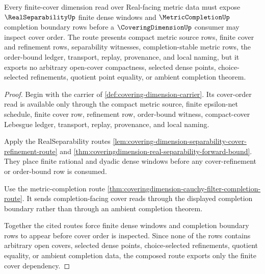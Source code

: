 \begin{theorem}
\label{thm:coveringdimension-real-separability-metric-completion-cover-route}
Every finite-cover dimension read over Real-facing metric data must expose $\RealSeparabilityUp$ finite dense windows and $\MetricCompletionUp$ completion boundary rows before a $\CoveringDimensionUp$ consumer may inspect cover order. The route presents compact metric source rows, finite cover and refinement rows, separability witnesses, completion-stable metric rows, the order-bound ledger, transport, replay, provenance, and local naming, but it exports no arbitrary open-cover compactness, selected dense points, choice-selected refinements, quotient point equality, or ambient completion theorem.
\end{theorem}
\begin{proof}
Begin with the carrier of \autoref{def:covering-dimension-carrier}. Its cover-order read is available only through the compact metric source, finite epsilon-net schedule, finite cover row, refinement row, order-bound witness, compact-cover Lebesgue ledger, transport, replay, provenance, and local naming.

Apply the RealSeparability routes \autoref{lem:covering-dimension-separability-cover-refinement-route} and \autoref{thm:coveringdimension-real-separability-forward-bound}. They place finite rational and dyadic dense windows before any cover-refinement or order-bound row is consumed.

Use the metric-completion route \autoref{thm:coveringdimension-cauchy-filter-completion-route}. It sends completion-facing cover reads through the displayed completion boundary rather than through an ambient completion theorem.

Together the cited routes force finite dense windows and completion boundary rows to appear before cover order is inspected. Since none of the rows contains arbitrary open covers, selected dense points, choice-selected refinements, quotient equality, or ambient completion data, the composed route exports only the finite cover dependency.
\end{proof}
